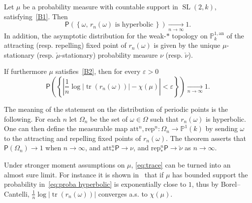 \documentclass[AHL,Unicode,longabstracts]{cedram}
\DeclareMathOperator{\tr}{tr}
\DeclareMathOperator{\SL}{SL}
\newcommand{\prob}{\mathsf{P}}
\newcommand{\Rep}{\mathrm{rep}}
\newcommand{\Att}{\mathrm{att}}
\newcommand{\e}{\varepsilon}
\newcommand{\cv}{\rightarrow}
\newcommand{\set}[1]{\left\{#1\right\}}
\newcommand{\abs}[1]{\left\vert#1\right\vert}
\newcommand{\PP}{\mathbb{P}}
\newcommand{\berk}{{\mathbb{P}^{1, \mathrm{an}}_k}}
\newcommand{\unsur}[1]{\frac{1}{#1}}
\newcommand{\lrpar}[1]{\left(#1\right)}
\newcommand{\SLk}{\SL(2,k)}
\begin{document}
\begin{theo}\label{thm:loxodromic}
Let $\mu$ be a probability measure with countable support in $\SLk$, satisfying~\eqref{B1}. Then
\begin{equation}\label{eq:proba hyperbolic}
\prob\lrpar{\left\{ \omega, \, r_n(\omega)
\text{ is hyperbolic}\, \right\}}
\underset {n\cv\infty}\longrightarrow 1.
\end{equation}
In addition, the asymptotic distribution for the weak-$\ast$ topology on $\berk$ of the attracting (resp. repelling) fixed point of $r_n(\omega)$ is given by the unique $\mu$-stationary (resp. $\check{\mu}$-stationary) probability measure $\nu$ (resp. $\check{\nu}$).

If furthermore $\mu$ satisfies~\eqref{B2}, then for every $\e>0$
\begin{equation}\label{eq:trace}
\prob\lrpar{\set{
\abs{ \unsur{n}\log\abs{\tr (r_n(\omega))} - \chi(\mu)} <\e }} \underset {n\cv\infty}\longrightarrow 1.
\end{equation}
\end{theo}

\begin{rema}\label{rem:301}
The meaning of the statement on the distribution of periodic points is the following. For each $n$ let $\Omega_n$ be the set of $\omega\in \Omega$ such that $r_n(\omega)$ is hyperbolic. One can then define the measurable map $\Att^n, \Rep^n: \Omega_n \to \PP^1(k)$ by sending $\omega$ to the attracting and repelling fixed points of $r_n(\omega)$. The theorem asserts that $\prob(\Omega_n) \to1$ when $n\to\infty$, and $\Att^n_* \prob \to \nu$, and $\Rep^n_* \prob \to \check{\nu}$ as $n\to\infty$.
\end{rema}

\begin{rema}\label{rem:302}
Under stronger moment assumptions on $\mu$, \eqref{eq:trace} can be turned
into an almost sure limit. For instance it is shown in~\cite[Thm.~1.4]{maher-tiozzo} that if $\mu$ has bounded support the probability in~\eqref{eq:proba hyperbolic} is exponentially close to $1$, thus by Borel--Cantelli, $\unsur{n}\log\abs{\tr (r_n(\omega))}$ converges a.s. to $\chi(\mu)$.
\end{rema}
\end{document}
